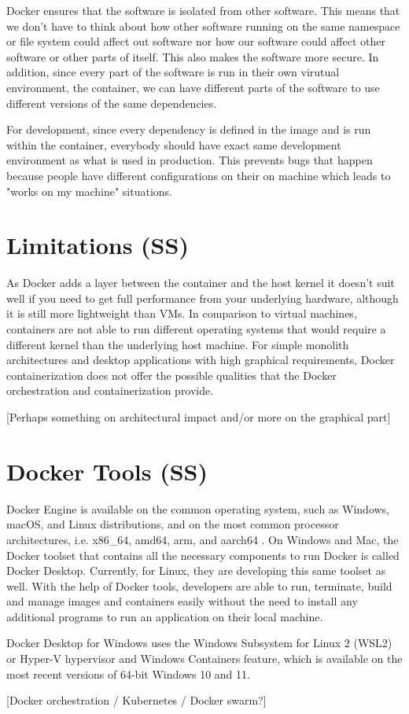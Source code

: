 \documentclass[fleqn,12pt]{olplainarticle}
\begin{document}
Docker ensures that the software is isolated from other software. This means that we don't have to think about how other software running on the same namespace or file system could affect out software nor how our software could affect other software or other parts of itself. This also makes the software more secure.
In addition, since every part of the software is run in their own virutual environment, the container, we can have different parts of the software to use different versions of the same dependencies.

For development, since every dependency is defined in the image and is run within the container, everybody should have exact same development environment as what is used in production. This prevents bugs that happen because people have different configurations on their on machine which leads to "works on my machine" situations.



\section{Limitations (SS)}

As Docker adds a layer between the container and the host kernel it doesn't suit well if you need to get full performance from your underlying hardware, although it is still more lightweight than VMs\citep{cloudsavvy:not_to_use}. In comparison to virtual machines, containers are not able to run different operating systems that would require a different kernel than the underlying host machine. For simple monolith architectures and desktop applications with high graphical requirements, Docker containerization does not offer the possible qualities that the Docker orchestration and containerization provide.

[Perhaps something on architectural impact and/or more on the graphical part]

\section{Docker Tools (SS)}

Docker Engine is available on the common operating system, such as Windows, macOS, and Linux distributions, and on the most common processor architectures, i.e. x86\_64, amd64, arm, and aarch64 \cite{docker:install}.  On Windows and Mac, the Docker toolset that contains all the necessary components to run Docker is called Docker Desktop. Currently, for Linux, they are developing this same toolset as well. With the help of Docker tools, developers are able to run, terminate, build and manage images and containers easily without the need to install any additional programs to run an application on their local machine.

Docker Desktop for Windows uses the Windows Subsystem for Linux 2 (WSL2) or Hyper-V hypervisor and Windows Containers feature, which is available on the most recent versions of 64-bit Windows 10 and 11\cite{docker:windows}.

[Docker orchestration / Kubernetes / Docker swarm?]


\end{document}

